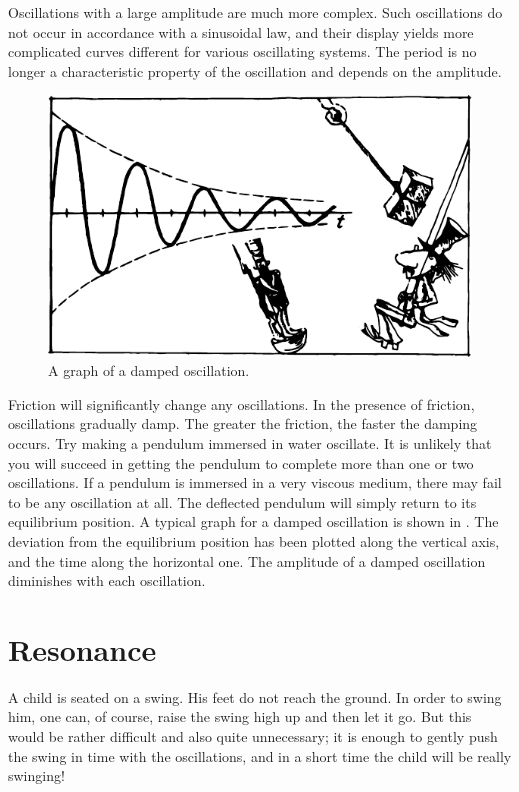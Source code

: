 Oscillations with a large amplitude are much more complex. Such oscillations do not occur in accordance with a sinusoidal law, and their display yields more complicated curves different for various oscillating systems. The period is no longer a characteristic property of the oscillation and depends on the amplitude.
\begin{figure}[!ht]
\centering
\includegraphics[width=\textwidth]{figures/fig-04-07.pdf}
\caption{A graph of a damped oscillation.}
\label{fig-4.07}
\end{figure}

Friction will significantly change any oscillations. In
the presence of friction, oscillations gradually damp. The
greater the friction, the faster the damping occurs. Try
making a pendulum immersed in water oscillate. It is
unlikely that you will succeed in getting the pendulum to
complete more than one or two oscillations. If a pendulum is immersed in a very viscous medium, there may fail to be any oscillation at all. The deflected pendulum will simply return to its equilibrium position. A typical graph for a damped oscillation is shown in . The deviation from the equilibrium position has been plotted
along the vertical axis, and the time along the horizontal one. The amplitude of a damped oscillation diminishes with each oscillation.

\section{Resonance}

A child is seated on a swing. His feet do not reach the
ground. In order to swing him, one can, of course, raise
the swing high up and then let it go. But this would be
rather difficult and also quite unnecessary; it is enough
to gently push the swing in time with the oscillations,
and in a short time the child will be really swinging!

